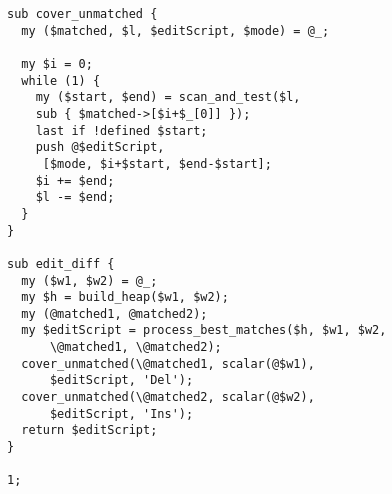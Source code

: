 \begin{lstlisting}
sub cover_unmatched {
  my ($matched, $l, $editScript, $mode) = @_;

  my $i = 0;
  while (1) {
    my ($start, $end) = scan_and_test($l,
	sub { $matched->[$i+$_[0]] });
    last if !defined $start;
    push @$editScript,
	 [$mode, $i+$start, $end-$start];
    $i += $end;
    $l -= $end;
  }
}

sub edit_diff {
  my ($w1, $w2) = @_;
  my $h = build_heap($w1, $w2);
  my (@matched1, @matched2);
  my $editScript = process_best_matches($h, $w1, $w2,
      \@matched1, \@matched2);
  cover_unmatched(\@matched1, scalar(@$w1),
      $editScript, 'Del');
  cover_unmatched(\@matched2, scalar(@$w2),
      $editScript, 'Ins');
  return $editScript;
}

1;
\end{lstlisting}

